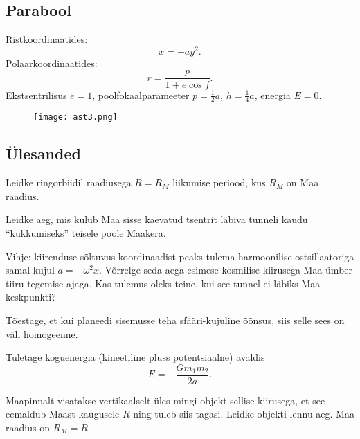 \documentclass[a4paper,11pt,twocolumn]{article}
\begin{document}
{\subsection{Parabool}
Ristkoordinaatides:
\[
x=-ay^2
.\]
Polaarkoordinaatides:
\[
r=\frac{p}{1+e \cos f}
.\]
Ekstsentrilisus $e=1$, poolfokaalparameeter  $p=\frac{1}{2}a$, $h=\frac{1}{4}a$, energia $E=0$.
\begin{figure}[h!]
    \centering
    \texttt{[image: ast3.png]}
    \label{fig:ast3-png}
\end{figure}
\vspace{-1em}

\subsection{Ülesanded}

\begin{question}
    Leidke ringorbiidil raadiusega $R=R_M$ liikumise periood, kus $R_M$ on Maa raadius.
\end{question}

\begin{question}
    Leidke aeg, mis kulub Maa sisse kaevatud tsentrit läbiva tunneli kaudu \enquote{kukkumiseks} teisele poole Maakera.
    \begin{hint}
    Vihje: kiirenduse sõltuvus koordinaadist peaks tulema harmoonilise ostsillaatoriga samal kujul $a=-\omega^2x$. Võrrelge seda aega esimese kosmilise kiirusega Maa ümber tiiru tegemise ajaga. Kas tulemus oleks teine, kui see tunnel ei läbiks Maa keskpunkti?
    \end{hint}
\end{question}

\begin{question}
    Tõestage, et kui planeedi sisemusse teha sfääri-kujuline õõnsus, siis selle sees on väli homogeenne.
\end{question}

\begin{question}
    Tuletage koguenergia (kineetiline pluss potentsiaalne) avaldis
    \[
    E=-\frac{Gm_1m_2}{2a}
    .\]
\end{question}

\begin{question}
    Maapinnalt visatakse vertikaalselt üles mingi objekt sellise kiirusega, et see eemaldub Maast kaugusele $R$ ning tuleb siis tagasi. Leidke objekti lennu-aeg. Maa raadius on $R_M=R$.
\end{question}

}
\end{document}
